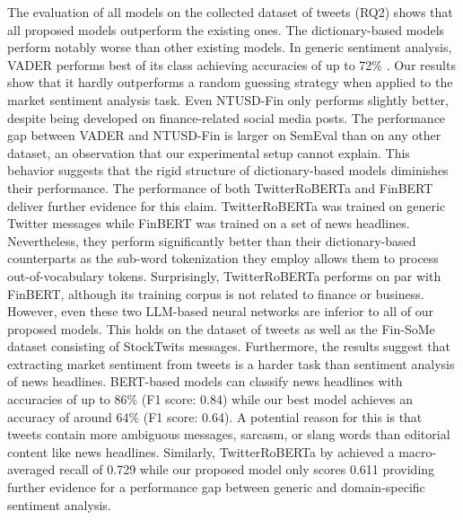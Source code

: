 The evaluation of all models on the collected dataset of tweets (RQ2) shows that all proposed models outperform the existing ones. The dictionary-based models perform notably worse than other existing models. In generic sentiment analysis, VADER performs best of its class achieving accuracies of up to 72\% . Our results show that it hardly outperforms a random guessing strategy when applied to the market sentiment analysis task. Even NTUSD-Fin only performs slightly better, despite being developed on finance-related social media posts. The performance gap between VADER and NTUSD-Fin is larger on SemEval than on any other dataset, an observation that our experimental setup cannot explain.
 This behavior suggests that the rigid structure of dictionary-based models diminishes their performance. The performance of both TwitterRoBERTa and FinBERT deliver further evidence for this claim. TwitterRoBERTa was trained on generic Twitter messages while FinBERT was trained on a set of news headlines. Nevertheless, they perform significantly better than their dictionary-based counterparts as the sub-word tokenization they employ allows them to process out-of-vocabulary tokens. Surprisingly, TwitterRoBERTa performs on par with FinBERT, although its training corpus is not related to finance or business. However, even these two LLM-based neural networks are inferior to all of our proposed models. This holds on the dataset of tweets as well as the Fin-SoMe dataset consisting of StockTwits messages.\newline
 Furthermore, the results suggest that extracting market sentiment from tweets is a harder task than sentiment analysis of news headlines. BERT-based models can classify news headlines with accuracies of up to 86\% (F1 score: 0.84)  while our best model achieves an accuracy of around 64\% (F1 score: 0.64). A potential reason for this is that tweets contain more ambiguous messages, sarcasm, or slang words than editorial content like news headlines. Similarly, TwitterRoBERTa by  achieved a macro-averaged recall of 0.729 while our proposed model only scores 0.611 providing further evidence for a performance gap between generic and domain-specific sentiment analysis.

